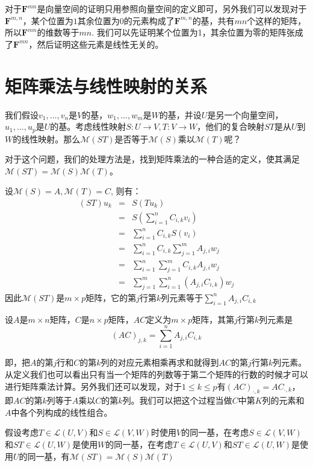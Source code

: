 \documentclass[10pt,a4paper,UTF8]{article}
\begin{document}
对于\(\mathbf{F}^{mn}\)是向量空间的证明只用参照向量空间的定义即可，另外我们可以发现对于\(\mathbf{F}^{m,n}\)，某个位置为\(1\)其余位置为\(0\)的元素构成了\(\mathbf{F}^{m,n}\)的基，共有\(mn\)个这样的矩阵，所以\(\mathbf{F}^{mn}\)的维数等于\(mn\). 我们可以先证明某个位置为1，其余位置为零的矩阵张成了\(\mathbf{F}^{mn}\)，然后证明这些元素是线性无关的。

\section{矩阵乘法与线性映射的关系}
\label{sec:org6e0b980}


我们假设\(v_{1},\ldots ,v_{n}\)是\(V\)的基，\(w_{1},\ldots ,w_{m}\)是\(W\)的基，并设\(U\)是另一个向量空间，\(u_{1},\ldots ,u_{p}\)是\(U\)的基。考虑线性映射\(S:U\rightarrow V, T:V\rightarrow W\)，他们的复合映射\(ST\)是从\(U\)到\(W\)的线性映射。那么\(\mathcal{M}(ST)\)是否等于\(\mathcal{M}(S)\)乘以\(\mathcal{M}(T)\)呢？

对于这个问题，我们的处理方法是，找到矩阵乘法的一种合适的定义，使其满足\(\mathcal{M}(ST) = \mathcal{M}(S) \mathcal{M}(T)\)。

设\(\mathcal{M}(S) = A, \mathcal{M}(T) = C\), 则有：
\begin{eqnarray}
\label{eq:6}
(ST)u_{k} &=& S(Tu_{k})  \\
&=& S(\sum_{i=1}^{n}C_{i,k}v_{i}) \\
&=&\sum_{i=1}^{n}C_{i,k}S(v_{i}) \\
&=&\sum_{i=1}^{n}C_{i,k}\sum_{j=1}^{m}A_{j,i}w_{j}\\
&=&\sum_{i=1}^{n}\sum_{j=1}^{m}C_{i,k}A_{j,i}w_{j} \\
&=&\sum_{j=1}^{m}\sum_{i=1}^{n}(A_{j,i}C_{i,k}) w_{j}
\end{eqnarray}
因此\(\mathcal{M}(ST)\)是\(m\times p\)矩阵，它的第\(j\)行第\(k\)列元素等于\(\sum_{i=1}^{n}A_{j,i}C_{i,k}\)
\begin{definition}


设\(A\)是\(m\times n\)矩阵，\(C\)是\(n\times p\)矩阵，\(AC\)定义为\(m\times p\)矩阵，其第\(j\)行第\(k\)列元素是\[(AC)_{j,k} = \sum_{i=1}^{n}A_{j,i}C_{i,k}\]

即，把\(A\)的第\(j\)行和\(C\)的第\(k\)列的对应元素相乘再求和就得到\(AC\)的第\(j\)行第\(k\)列元素。从定义我们也可以看出只有当一个矩阵的列数等于第二个矩阵的行数的时候才可以进行矩阵乘法计算。另外我们还可以发现，对于\(1 \leq k \leq p\)有\((AC)_{\cdot,k} = AC_{\cdot,k}\)，即\(AC\)的第\(k\)列等于\(A\)乘以\(C\)的第\(k\)列。我们可以把这个过程当做\(C\)中第\(K\)列的元素和\(A\)中各个列构成的线性组合。
\end{definition}
假设考虑\(T\in \mathcal{L}(U,V)\)和\(S\in \mathcal{L}(V,W)\)时使用\(V\)的同一基，在考虑\(S\in \mathcal{L}(V,W)\)和\(ST\in \mathcal{L}(U,W)\)是使用\(W\)的同一基，在考虑\(T\in \mathcal{L}(U,V)\)和\(ST\in \mathcal{L}(U,W)\)是使用\(U\)的同一基，有\(\mathcal{M}(ST) = \mathcal{M}(S) \mathcal{M}(T)\)
\end{document}
